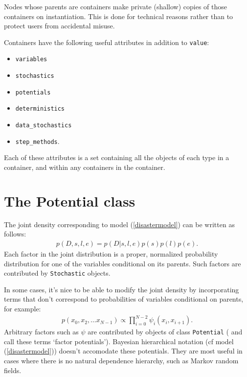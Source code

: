 Nodes whose parents are containers make private (shallow) copies of those containers on instantiation. This is done for technical reasons rather than to protect users from accidental misuse.

Containers have the following useful attributes in addition to \texttt{value}:
\begin{itemize}
    \item\texttt{variables}
    \item\texttt{stochastics}
    \item\texttt{potentials}
    \item\texttt{deterministics}
    \item\texttt{data_stochastics}
    \item\texttt{step_methods}.
\end{itemize}
Each of these attributes is a set containing all the objects of each type in a container, and within any containers in the container.


\hypertarget{potential}{}
\section*{The Potential class} \label{potential}

% 

The joint density corresponding to model (\ref{disastermodel}) can be written as follows:
\begin{eqnarray*}
    p(D,s,l,e) = p(D|s,l,e) p(s) p(l) p(e).
\end{eqnarray*}
Each factor in the joint distribution is a proper, normalized probability distribution for one of the variables conditional on its parents. Such factors are contributed by \texttt{Stochastic} objects.

In some cases, it's nice to be able to modify the joint density by incorporating terms that don't correspond to probabilities of variables conditional on parents, for example:
\begin{eqnarray*}
    p(x_0, x_2, \ldots x_{N-1}) \propto \prod_{i=0}^{N-2} \psi_i(x_i, x_{i+1}).
\end{eqnarray*}
Arbitrary factors such as $\psi$ are contributed by objects of class \texttt{Potential} (\cite{dawidmarkov} and \cite{jordangraphical} call these terms `factor potentials'). Bayesian hierarchical notation (cf model (\ref{disastermodel})) doesn't accomodate these potentials. They are most useful in cases where there is no natural dependence hierarchy, such as Markov random fields.

